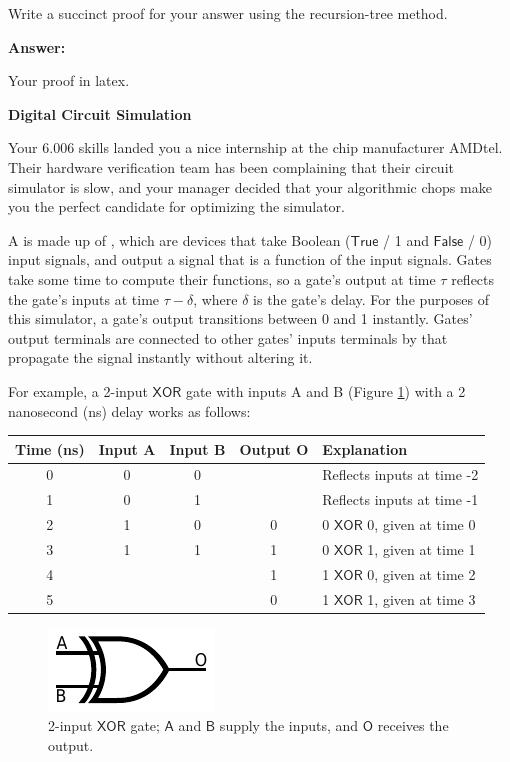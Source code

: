\documentclass[12pt,twoside]{article}
\newcommand{\answer}{
 \par\medskip
 \textbf{Answer:}
}
\newcommand{\answerIu}{ \answer
Your proof in latex.
}
\begin{document}
\begin{problems}
\begin{problemparts}
  \problempart {} Write a succinct proof for your answer using the  
  recursion-tree method.
  \answerIu
\end{problemparts}



\problem {} \textbf{Digital Circuit Simulation}

Your 6.006 skills landed you a nice internship at the chip manufacturer AMDtel.
Their hardware verification team has been complaining that their circuit
simulator is slow, and your manager decided that your algorithmic chops make
you the perfect candidate for optimizing the simulator.

A  is made up of , which are devices that take Boolean
($\mathsf{True}$ / 1 and $\mathsf{False}$ / 0) input signals, and output a
signal that is a function of the input signals. Gates take some time to compute
their functions, so a gate's output at time $\tau$ reflects the gate's inputs at
time $\tau - \delta$, where $\delta$ is the gate's delay. For the purposes of
this simulator, a gate's output transitions between 0 and 1 instantly. Gates'
output terminals are connected to other gates' inputs terminals by 
that propagate the signal instantly without altering it.

For example, a 2-input $\mathsf{XOR}$ gate with inputs A and B (Figure
\ref{fig:xor}) with a 2 nanosecond (ns) delay works as follows: 

\begin{center}
\begin{tabular}{|c|c|c|c|l|}
\hline
Time (ns) & Input A & Input B & Output O & Explanation \\
\hline
0 & 0 & 0 &   & Reflects inputs at time -2 \\ 
1 & 0 & 1 &   & Reflects inputs at time -1 \\ 
2 & 1 & 0 & 0 & 0 $\mathsf{XOR}$ 0, given at time 0 \\
3 & 1 & 1 & 1 & 0 $\mathsf{XOR}$ 1, given at time 1 \\
4 &   &   & 1 & 1 $\mathsf{XOR}$ 0, given at time 2 \\
5 &   &   & 0 & 1 $\mathsf{XOR}$ 1, given at time 3 \\
\hline
\end{tabular}
\end{center}

\begin{figure}[htbp]
\centering
\includegraphics{figures/xor-ansi}
\caption{2-input $\mathsf{XOR}$ gate; $\mathsf{A}$ and $\mathsf{B}$ supply the
inputs, and $\mathsf{O}$ receives the output.}
\label{fig:xor}
\end{figure}  


\end{problems}
\end{document}
